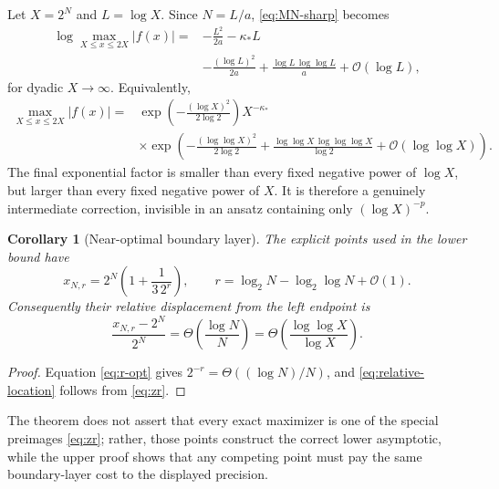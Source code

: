 \documentclass[11pt,oneside]{article}
\newtheorem{corollary}[theorem]{Corollary}
\theoremstyle{definition}
\theoremstyle{remark}
\newcommand{\bigO}{\mathcal O}
\begin{document}
Let $X=2^N$ and $L=\log X$.  Since $N=L/a$, \eqref{eq:MN-sharp} becomes
\begin{equation}
 \boxed{\begin{aligned}
 \log\max_{X\le x\le2X}|f(x)|
 ={}&-\frac{L^2}{2a}-\kappa_*L\\
 &-\frac{(\log L)^2}{2a}
 +\frac{\log L\,\log\log L}{a}
 +\bigO(\log L),
 \end{aligned}}                                             \label{eq:MX-sharp}
\end{equation}
for dyadic $X\to\infty$.  Equivalently,
\begin{equation}
 \begin{split}
 \max_{X\le x\le2X}|f(x)|
 ={}&\exp\!\left(-\frac{(\log X)^2}{2\log2}\right)
 X^{-\kappa_*}\\
 &\times\exp\!\left(
 -\frac{(\log\log X)^2}{2\log2}
 +\frac{\log\log X\,\log\log\log X}{\log2}
 +\bigO(\log\log X)\right).
 \end{split}                                                \label{eq:MX-multiplicative}
\end{equation}
The final exponential factor is smaller than every fixed negative power of
$\log X$, but larger than every fixed negative power of $X$.  It is therefore
a genuinely intermediate correction, invisible in an ansatz containing only
$(\log X)^{-p}$.

\begin{corollary}[Near-optimal boundary layer]
The explicit points used in the lower bound have
\begin{equation}
 x_{N,r}=2^N\left(1+\frac{1}{3\,2^r}\right),
 \qquad
 r=\log_2N-\log_2\log N+\bigO(1).                          \label{eq:near-opt-location}
\end{equation}
Consequently their relative displacement from the left endpoint is
\begin{equation}
 \frac{x_{N,r}-2^N}{2^N}
 =\Theta\!\left(\frac{\log N}{N}\right)
 =\Theta\!\left(\frac{\log\log X}{\log X}\right).         \label{eq:relative-location}
\end{equation}
\end{corollary}

\begin{proof}
Equation \eqref{eq:r-opt} gives $2^{-r}=\Theta((\log N)/N)$, and
\eqref{eq:relative-location} follows from \eqref{eq:zr}.
\end{proof}

The theorem does not assert that every exact maximizer is one of the special
preimages \eqref{eq:zr}; rather, those points construct the correct lower
asymptotic, while the upper proof shows that any competing point must pay the
same boundary-layer cost to the displayed precision.
\end{document}
